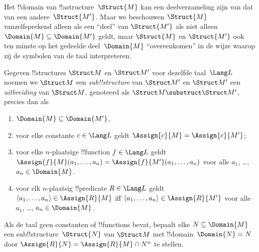 \documentclass[../../../include/open-logic-section]{subfiles}
\begin{document}

Het !!{domain} van !!a{structure}~$\Struct{M}$ kan een deelverzameling
zijn van dat van een andere~$\Struct{M'}$.  Maar we beschouwen
$\Struct{M}$ vanzelfsprekend alleen als een ``deel'' van $\Struct{M'}$
als niet alleen $\Domain{M} \subseteq \Domain{M'}$ geldt, maar
$\Struct{M}$ en $\Struct{M'}$ ook ten minste op het gedeelde
deel~$\Domain{M}$ ``overeenkomen'' in de wijze waarop zij de symbolen
van de taal interpreteren.

\begin{defn}
Gegeven !!{structure}s $\Struct M$ en $\Struct M'$ voor dezelfde
taal~$\Lang L$ noemen we $\Struct M$ een \emph{sub!!{structure}} van
$\Struct M'$ en $\Struct M'$ een \emph{uitbreiding} van $\Struct M$,
genoteerd als $\Struct M \substruct \Struct M'$, precies dan als
\begin{enumerate}
\item $\Domain{M} \subseteq \Domain{M'}$,
\item voor elke constante $c \in \Lang L$ geldt $\Assign{c}{M} =
    \Assign{c}{M'}$;
\item voor elke $n$-plaatsige !!{function} $f \in \Lang L$ geldt
  $\Assign{f}{M}(a_1, \dots, a_n) = \Assign{f}{M'}(a_1, \dots, a_n)$
  voor alle $a_1$, \dots, $a_n \in \Domain{M}$.
\item voor elk $n$-plaatsig !!{predicate} $R \in \Lang L$ geldt $\langle
  a_1, \dots, a_n\rangle \in \Assign{R}{M}$ iff $\langle a_1, \dots,
  a_n\rangle \in \Assign{R}{M'}$ voor alle $a_1$, \dots, $a_n \in
  \Domain{M}$.
\end{enumerate}
\end{defn}

\begin{rem}
Als de taal geen constanten of !!{function}s bevat, bepaalt elke $N
\subseteq \Domain{M}$ een sub!!{structure}~$\Struct{N}$ van
$\Struct M$ met !!{domain}~$\Domain{N} = N$ door $\Assign{R}{N} =
\Assign{R}{M} \cap N^n$ te stellen.
\end{rem}

\end{document}
